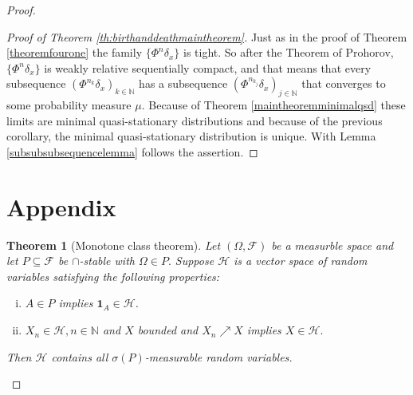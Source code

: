 \documentclass[12pt,a4paper]{scrartcl}
\newtheorem{theorem}{Theorem}[section]
\numberwithin{equation}{section}
\newcommand{\N}{\mathbb{N}} %
\begin{document}
\begin{proof}
\begin{proof} [Proof of Theorem \ref{th:birthanddeathmaintheorem}]
Just as in the proof of Theorem \ref{theoremfourone} the family $\lbrace \Phi^n \delta_x \rbrace$ is tight. So after the Theorem of Prohorov, $\lbrace \Phi^n \delta_x \rbrace$ is weakly relative sequentially compact, and that means that every subsequence $\left(\Phi^{n_k} \delta_x \right)_{k \in \N}$ has a subsequence $\left(\Phi^{n_{k_j}} \delta_x \right)_{j \in \N}$ that converges to some probability measure $\mu.$ Because of Theorem \ref{maintheoremminimalqsd} these limits are minimal quasi-stationary distributions and because of the previous corollary, the minimal quasi-stationary distribution is unique. With Lemma \ref{subsubsubsequencelemma} follows the assertion.
\end{proof}

\appendix
\section{Appendix}

\begin{theorem}[Monotone class theorem] \label{th:MonotoneClass}
Let $\left(\Omega, \mathcal{F} \right)$ be a measurble space and let $P \subseteq \mathcal{F}$ be $\cap$-stable with $\Omega \in P.$ Suppose $\mathcal{H}$ is a vector space of random variables satisfying the following properties:
\begin{enumerate}[(i)]
\item $A \in P$ implies $\textbf{1}_A \in \mathcal{H}$.
\item $X_n \in \mathcal{H}, n \in \N$ and $X$ bounded and $X_n \nearrow X$ implies $X \in \mathcal{H}.$
\end{enumerate}
Then $\mathcal{H}$ contains all $\sigma\left(P\right)$-measurable random variables.
\end{theorem}



\end{proof}
\end{document}
